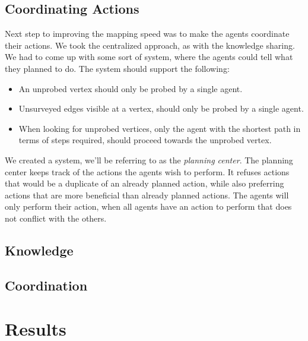 \documentclass[11pt]{report}
\begin{document}
\subsection*{Coordinating Actions}
Next step to improving the mapping speed was to make the agents coordinate their actions. We took the centralized approach, as with the knowledge sharing. We had to come up with some sort of system, where the agents could tell what they planned to do. The system should support the following:
\begin{itemize}
	\item An unprobed vertex should only be probed by a single agent.
	\item Unsurveyed edges visible at a vertex, should only be probed by a single agent.
	\item When looking for unprobed vertices, only the agent with the shortest path in terms of steps required, should proceed towards the unprobed vertex.
\end{itemize}

We created a system, we'll be referring to as the \emph{planning center}. The planning center keeps track of the actions the agents wish to perform. It refuses actions that would be a duplicate of an already planned action, while also preferring actions that are more beneficial than already planned actions. The agents will only perform their action, when all agents have an action to perform that does not conflict with the others.
\subsection*{Knowledge}


\subsection*{Coordination}


\section*{Results}
\end{document}
